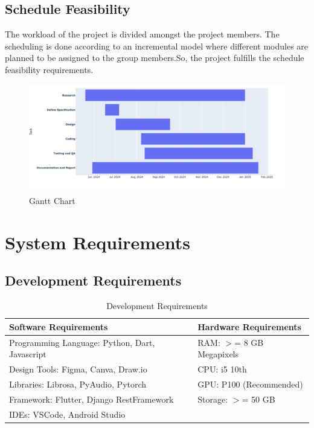 \subsection{Schedule Feasibility}
The workload of the project is divided amongst the project members. The
scheduling is done according to an incremental model where different modules
are planned to be assigned to the group members.So, the project fulfills the
schedule feasibility requirements.
\begin{figure}[h]
    \centering
    \includegraphics[scale=0.4]{images/GanttChart.png}
    \caption{Gantt Chart}\label{fig:my_label}
\end{figure}
\newpage
\section{System Requirements}

\subsection{Development Requirements}
\begin{table}[h]
    \centering
    \caption{Development Requirements}
    \begin{tabular}{|l|l|}
        \hline
        \textbf{Software Requirements}                 & \textbf{Hardware
        Requirements}                                                          \\ \hline
        Programming Language: Python, Dart, Javascript & RAM: \(>\)= 8 GB
        Megapixels                                                             \\ \hline
        Design Tools: Figma, Canva, Draw.io            & CPU: i5 10th 
        \\ \hline
        Libraries: Librosa, PyAudio, Pytorch           & GPU: P100
        (Recommended)                                                          \\ \hline
        Framework: Flutter, Django RestFramework       & Storage: \(>\)= 50 GB
        \\ \hline
        IDEs: VSCode, Android Studio                  &
        \\ \hline
    \end{tabular}
\end{table}

